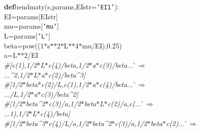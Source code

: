 {{\begin{tabbing}
\\

\\
{\textbf{def}}\hspace{5pt}bendmaty(s,params,EIstr={\texttt{{'}EI1{'}}}):
\\
\hspace{20pt}EI=params{[}EIstr{]}
\\
\hspace{20pt}mu=params{[}{\texttt{{'}mu{'}}}{]}
\\
\hspace{20pt}L=params{[}{\texttt{{'}L{'}}}{]}
\\
\hspace{20pt}beta=pow((\dash{}1$\ast$s$\ast$$\ast$2$\ast$L$\ast$$\ast$4$\ast$mu/EI),0.25)
\\
\hspace{20pt}a=L$\ast$$\ast$2/EI
\\
{\it{\#{[}\hspace{85pt}c(1),\hspace{25pt}\dash{}1/2$\ast$L$\ast$c(4)/beta,\hspace{15pt}\dash{}1/2$\ast$a$\ast$c(3)/beta}}{}...\`$\Rightarrow$\\
...{}{\it{\^{}2,\hspace{5pt}\dash{}1/2$\ast$L$\ast$a$\ast$c(2)/beta\^{}3{]}
}}\\
{\it{\#{[}\hspace{25pt}\dash{}1/2$\ast$beta$\ast$c(2)/L,\hspace{85pt}c(1),\hspace{20pt}1/2$\ast$a$\ast$c(4)/beta}}{}...\`$\Rightarrow$\\
...{}{\it{/L,\hspace{20pt}1/2$\ast$a$\ast$c(3)/beta\^{}2{]}
}}\\
{\it{\#{[}\hspace{15pt}\dash{}1/2$\ast$beta\^{}2$\ast$c(3)/a,\hspace{20pt}1/2$\ast$beta$\ast$L$\ast$c(2)/a,\hspace{85pt}c(}}{}...\`$\Rightarrow$\\
...{}{\it{1),\hspace{30pt}1/2$\ast$L$\ast$c(4)/beta{]}
}}\\
{\it{\#{[}\hspace{5pt}\dash{}1/2$\ast$beta\^{}3$\ast$c(4)/L/a,\hspace{20pt}1/2$\ast$beta\^{}2$\ast$c(3)/a,\hspace{30pt}1/2$\ast$beta$\ast$c(2)}}{}...\`$\Rightarrow$\\
$$
\end{tabbing}}}
